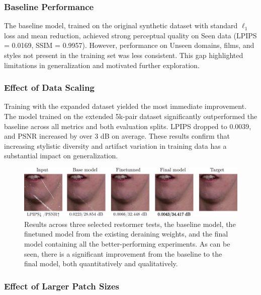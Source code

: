 \documentclass[10pt,a4paper,twocolumn,twoside]{article}
\begin{document}
\subsubsection{Baseline Performance}

The baseline model, trained on the original synthetic dataset with standard $\ell_1$ loss and mean reduction, achieved strong perceptual quality on Seen data (LPIPS = 0.0169, SSIM = 0.9957). However, performance on Unseen domains, films, and styles not present in the training set was less consistent. This gap highlighted limitations in generalization and motivated further exploration.

\subsubsection{Effect of Data Scaling}

Training with the expanded dataset yielded the most immediate improvement. The model trained on the extended 5k-pair dataset significantly outperformed the baseline across all metrics and both evaluation splits. LPIPS dropped to 0.0039, and PSNR increased by over 3 dB on average. These results confirm that increasing stylistic diversity and artifact variation in training data has a substantial impact on generalization.
\begin{figure}[t]
    \centering
    \includegraphics[width= \textwidth]{img/comparason_restormer.pdf}\vspace{-0.6em}
    \caption{\small Results across three selected restormer tests, the baseline model, the finetuned model from the existing deraining weights, and the final model containing all the better-performing experiments. As can be seen, there is a significant improvement from the baseline to the final model, both quantitatively and qualitatively.}
    \label{fig:comparason_restormer}
    \vspace{-1em}
\end{figure}
\subsubsection{Effect of Larger Patch Sizes}
\end{document}
